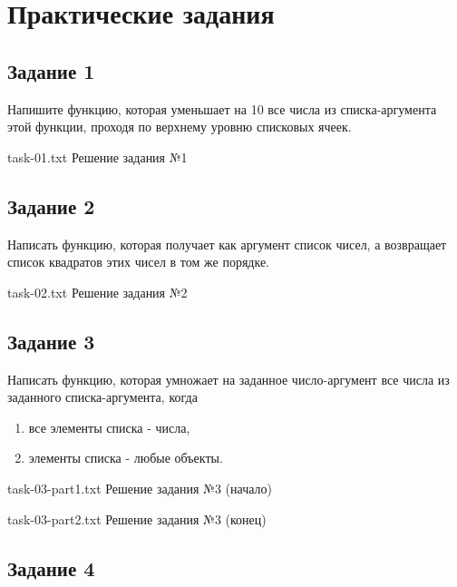 \chapter{Практические задания}

\section{Задание 1}

Напишите функцию, которая уменьшает на 10 все числа из списка-аргумента этой функции, проходя по верхнему уровню списковых ячеек.

{task-01.txt} %
{Решение задания №1} %

\section{Задание 2}

Написать функцию, которая получает как аргумент список чисел, а возвращает список квадратов этих чисел в том же порядке.

{task-02.txt} %
{Решение задания №2} %


\section{Задание 3}

Написать функцию, которая умножает на заданное число-аргумент все числа из заданного списка-аргумента, когда

\begin{enumerate}[label={\alph*)}]
	\item все элементы списка - числа,
	\item элементы списка - любые объекты.
\end{enumerate}

{task-03-part1.txt} %
{Решение задания №3 (начало)} %

{task-03-part2.txt} %
{Решение задания №3 (конец)} %

\section{Задание 4}

